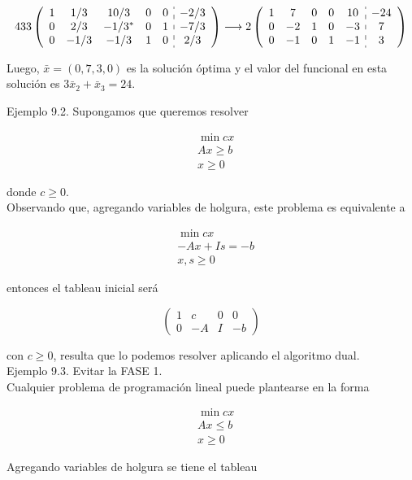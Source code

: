 \documentclass[10pt]{article}
\begin{document}
$$
433\left(\begin{array}{ccccc:c}
1 & 1 / 3 & 10 / 3 & 0 & 0 & -2 / 3 \\
0 & 2 / 3 & -1 / 3^{*} & 0 & 1 & -7 / 3 \\
0 & -1 / 3 & -1 / 3 & 1 & 0 & 2 / 3
\end{array}\right) \longrightarrow 2\left(\begin{array}{ccccc:c}
1 & 7 & 0 & 0 & 10 & -24 \\
0 & -2 & 1 & 0 & -3 & 7 \\
0 & -1 & 0 & 1 & -1 & 3
\end{array}\right)
$$

Luego, $\bar{x}=(0,7,3,0)$ es la solución óptima y el valor del funcional en esta solución es $3 \bar{x}_{2}+\bar{x}_{3}=24$.

Ejemplo 9.2. Supongamos que queremos resolver

$$
\begin{aligned}
& \min c x \\
& A x \geq b \\
& x \geq 0
\end{aligned}
$$

donde $c \geq 0$.\\
Observando que, agregando variables de holgura, este problema es equivalente a

$$
\begin{aligned}
& \min c x \\
& -A x+I s=-b \\
& x, s \geq 0
\end{aligned}
$$

entonces el tableau inicial será

$$
\left(\begin{array}{ccc|c}
1 & c & 0 & 0 \\
0 & -A & I & -b
\end{array}\right)
$$

con $c \geq 0$, resulta que lo podemos resolver aplicando el algoritmo dual.\\
Ejemplo 9.3. Evitar la FASE 1.\\
Cualquier problema de programación lineal puede plantearse en la forma

$$
\begin{aligned}
& \min c x \\
& A x \leq b \\
& x \geq 0
\end{aligned}
$$

Agregando variables de holgura se tiene el tableau
\end{document}
